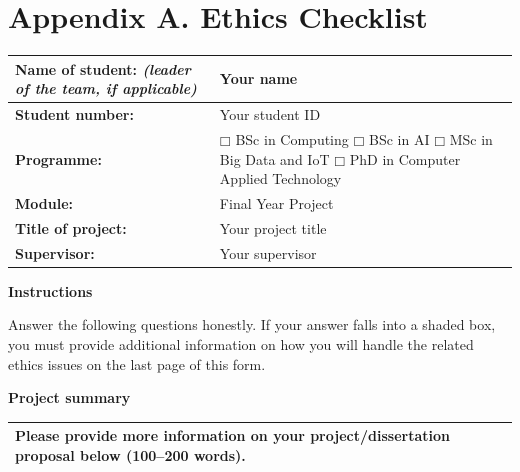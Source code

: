 \documentclass[11pt,a4paper]{article}
\begin{document}
\clearpage
{}
{}
\section*{Appendix A. Ethics Checklist}

\begingroup
{}              %
\renewcommand{\arraystretch}{1.2} %
\begin{tabular}{|>{\raggedright\arraybackslash}p{4.8cm}|p{10.0cm}|}
\hline
\textbf{Name of student:}\newline
\textit{(leader of the team, if applicable)} & Your name \\ \hline
\textbf{Student number:} & Your student ID \\ \hline
\textbf{Programme:} &
  $\mdlgwhtsquare$ BSc in Computing \quad\quad\quad\quad $\mdlgwhtsquare$ BSc in AI \newline
  $\mdlgwhtsquare$ MSc in Big Data and IoT \newline
  $\mdlgwhtsquare$ PhD in Computer Applied Technology \\ \hline
\textbf{Module:} & Final Year Project \\ \hline
\textbf{Title of project:} & Your project title \\ \hline
\textbf{Supervisor:} & Your supervisor \\ \hline
\end{tabular}
\endgroup

\vspace{\baselineskip}

\textbf{Instructions}

Answer the following questions honestly. If your answer falls into a shaded box, you must provide additional information on how you will handle the related ethics issues on the last page of this form.

\vspace{\baselineskip}

\textbf{Project summary}

\begingroup
{}          %
\renewcommand{\arraystretch}{1.2} %
\begin{tabular}{|p{15.4cm}|}
\hline
Please provide more information on your project/dissertation proposal below (100--200 words).\\[9cm]
\hline
\end{tabular}
\endgroup
\end{document}

